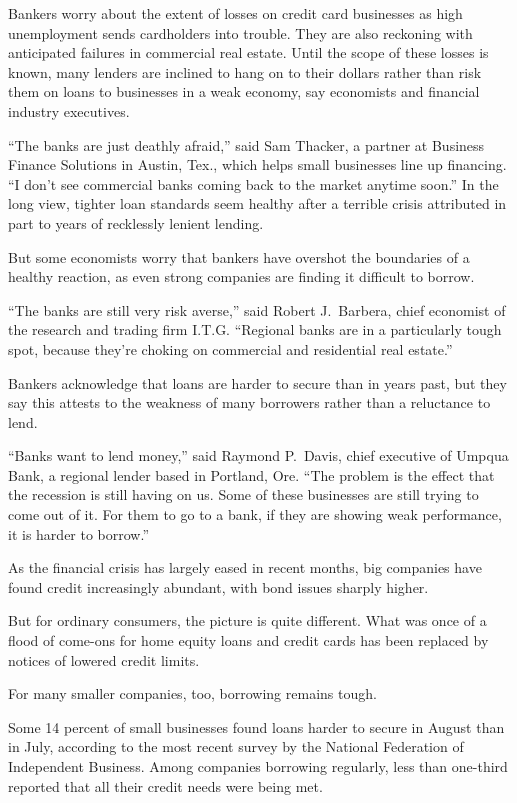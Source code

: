 ﻿\documentclass[12pt]{article}
\begin{document}
Bankers worry about the extent of losses on credit card businesses as high unemployment sends
cardholders into trouble. They are also reckoning\cite{reckon} with anticipated failures in
commercial real estate. Until the scope of these losses is known, many lenders are inclined to hang
on to their dollars rather than risk them on loans to businesses in a weak economy, say economists
and financial industry executives.

``The banks are just deathly afraid,'' said Sam Thacker, a partner at Business Finance Solutions in
Austin, Tex., which helps small businesses line up financing. ``I don't see commercial banks coming
back to the market anytime soon.'' In the long view, tighter loan standards seem healthy after a
terrible crisis attributed in part to years of recklessly lenient lending.

But some economists worry that bankers have overshot the boundaries of a healthy reaction, as even
strong companies are finding it difficult to borrow.

``The banks are still very risk averse,'' said Robert J.~Barbera, chief economist of the research
and trading firm I.T.G. ``Regional banks are in a particularly tough spot, because they're choking
on commercial and residential real estate.''

Bankers acknowledge that loans are harder to secure than in years past, but they say this attests to
the weakness of many borrowers rather than a reluctance to lend.

``Banks want to lend money,'' said Raymond P.~Davis, chief executive of Umpqua Bank, a regional
lender based in Portland, Ore. ``The problem is the effect that the recession is still having on us.
Some of these businesses are still trying to come out of it. For them to go to a bank, if they are
showing weak performance, it is harder to borrow.''

As the financial crisis has largely eased in recent months, big companies have found credit
increasingly abundant, with bond issues sharply higher.

But for ordinary consumers, the picture is quite different. What was once of a flood of come-ons for
home equity loans and credit cards has been replaced by notices of lowered credit limits.

For many smaller companies, too, borrowing remains tough.

Some 14 percent of small businesses found loans harder to secure in August than in July, according
to the most recent survey by the National Federation of Independent Business. Among companies
borrowing regularly, less than one-third reported that all their credit needs were being met.
\end{document}
